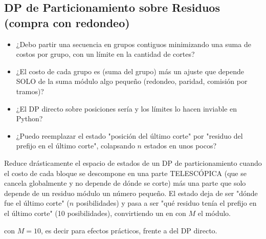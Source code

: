 \subsection{DP de Particionamiento sobre Residuos (compra con redondeo)}
\label{alg:6-1}


\begin{itemize}
\item ¿Debo partir una secuencia en grupos contiguos minimizando una suma de costos por grupo, con un límite en la cantidad de cortes?
\item ¿El costo de cada grupo es (suma del grupo) más un ajuste que depende SOLO de la suma módulo algo pequeño (redondeo, paridad, comisión por tramos)?
\item ¿El DP directo sobre posiciones sería  y los límites lo hacen inviable en Python?
\item ¿Puedo reemplazar el estado "posición del último corte" por "residuo del prefijo en el último corte", colapsando $n$ estados en unos pocos?
\end{itemize}

 Reduce drásticamente el espacio de estados de un DP de particionamiento cuando el costo de cada bloque se descompone en una parte TELESCÓPICA (que se cancela globalmente y no depende de dónde se corte) más una parte que solo depende de un residuo módulo un número pequeño. El estado deja de ser "dónde fue el último corte" ($n$ posibilidades) y pasa a ser "qué residuo tenía el prefijo en el último corte" (10 posibilidades), convirtiendo un  en  con $M$ el módulo.

  con $M = 10$, es decir  para efectos prácticos, frente a  del DP directo.

